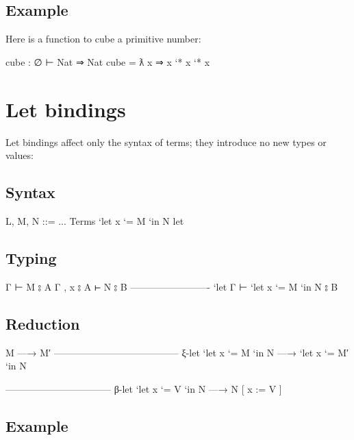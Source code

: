\hypertarget{example}{%
\subsection{Example}\label{example}}

Here is a function to cube a primitive number:

\begin{myDisplay}
cube : ∅ ⊢ Nat ⇒ Nat
cube = ƛ x ⇒ x `* x `* x
\end{myDisplay}

\hypertarget{let-bindings}{%
\section{Let bindings}\label{let-bindings}}

Let bindings affect only the syntax of terms; they introduce no new
types or values:

\hypertarget{syntax-1}{%
\subsection{Syntax}\label{syntax-1}}

\begin{myDisplay}
L, M, N ::= ...                     Terms
  `let x `= M `in N                   let
\end{myDisplay}

\hypertarget{typing-1}{%
\subsection{Typing}\label{typing-1}}

\begin{myDisplay}
Γ ⊢ M ⦂ A
Γ , x ⦂ A ⊢ N ⦂ B
------------------------- `let
Γ ⊢ `let x `= M `in N ⦂ B
\end{myDisplay}

\hypertarget{reduction-1}{%
\subsection{Reduction}\label{reduction-1}}

\begin{myDisplay}
M —→ M′
--------------------------------------- ξ-let
`let x `= M `in N —→ `let x `= M′ `in N

--------------------------------- β-let
`let x `= V `in N —→ N [ x := V ]
\end{myDisplay}

\hypertarget{example-1}{%
\subsection{Example}\label{example-1}}

